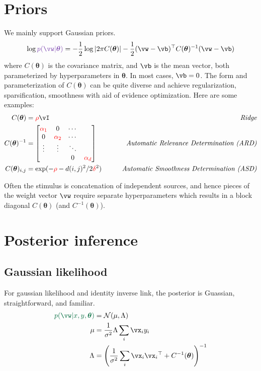 \documentclass{article}
\newcounter{ct}
\newcommand{\inv}{^{-1}}
\newcommand{\trp}{{^\top}} %
\newcommand{\Gaussian}{\ensuremath{\mathcal{N}}} %
\newcommand{\weight}{\vw}
\newcommand{\hyp}{\bm{\theta}}
\newcommand{\prior}{\ensuremath{\textcolor{amethyst}{p(\weight|\hyp)}}}
\newcommand{\posterior}{\textcolor{cadmiumgreen}{p(\weight|x,y,\hyp)}}
\begin{document}
\section{Priors}
We mainly support Gaussian priors.
\begin{align}
    \log\prior =
	-\frac{1}{2}\log|2\pi C(\hyp)| 
	-\frac{1}{2}(\weight - \vb)\trp C(\hyp)\inv (\weight - \vb)
	\label{eq:prior:Gaussian}
\end{align}
where $C(\hyp)$ is the covariance matrix, and $\vb$ is the mean vector, both parameterized by hyperparameters in $\hyp$.
In most cases, $\vb = 0$.
The form and parameterization of $C(\hyp)$ can be quite diverse and achieve regularization, sparsification, smoothness with aid of evidence optimization.
Here are some examples:
\begin{align}
    C(\hyp) &= \textcolor{red}{\rho} \vI \qquad & \text{\it Ridge}
    \label{eq:prior:Ridge}
    \\
    C(\hyp)\inv &= \begin{bmatrix} 
		    \textcolor{red}{\alpha_1} & 0        & \cdots& \\
		    0        & \textcolor{red}{\alpha_2} & \cdots & \\
		    \vdots   & \vdots   & \ddots & \\
		    &          & 0      & \textcolor{red}{\alpha_d} \\
		\end{bmatrix}
	    \qquad & \text{\it Automatic Relevance Determination (ARD)}
    \label{eq:prior:ARD}
    \\
    C(\hyp)_{i,j} &= \exp(-\textcolor{red}{\rho} -d(i,j)^2/2\textcolor{red}{\delta}^2 )
	    \qquad & \text{\it Automatic Smoothness Determination (ASD)}
    \label{eq:prior:ASD}
\end{align}

Often the stimulus is concatenation of independent sources, and hence pieces of the weight vector $\weight$ require separate hyperparameters which results in a block diagonal $C(\hyp)$ (and $C\inv(\hyp)$).

\section{Posterior inference}
\subsection{Gaussian likelihood}
For gaussian likelihood and identity inverse link, the posterior is Guassian, straightforward, and familiar.
\begin{align}
    \posterior &= \Gaussian(\mu, \Lambda)
    \label{eq:posterior:Gaussian}
    \\
    \mu &= \frac{1}{\sigma^2}\Lambda \sum_i \vx_i y_i\\
    \Lambda &= \left(\frac{1}{\sigma^2}\sum_i \vx_i \vx_i\trp + C\inv(\hyp)\right)\inv
\end{align}
\end{document}

